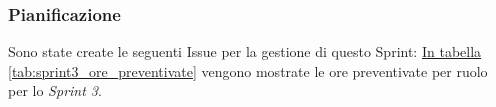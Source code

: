 \subsubsection{Pianificazione}
Sono state create le seguenti Issue per la gestione di questo Sprint: 
\hyperref[tab:sprint3_ore_preventivate]{In tabella \ref{tab:sprint3_ore_preventivate}} vengono mostrate le ore preventivate per ruolo per lo \textit{Sprint 3}.

\begin{table}[H]
    \centering
    \caption{Ore preventivate per ruolo Sprint 3}
    \label{tab:sprint3_ore_preventivate}
\end{table}
